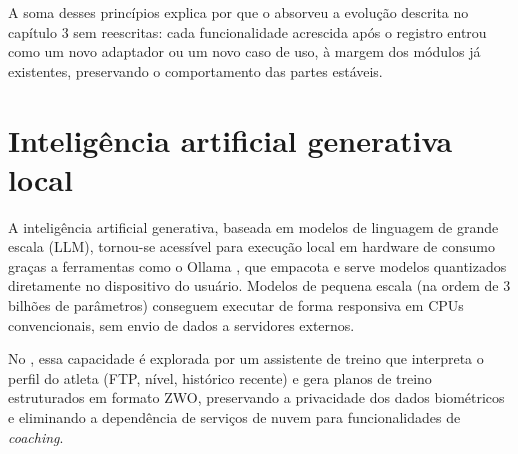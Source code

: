 A soma desses princípios explica por que o \argus{} absorveu a evolução
descrita no capítulo 3 sem reescritas: cada funcionalidade acrescida após o
registro entrou como um novo adaptador ou um novo caso de uso, à margem dos
módulos já existentes, preservando o comportamento das partes estáveis.

\section{Inteligência artificial generativa local}
\label{sec:ia-local}

A inteligência artificial generativa, baseada em modelos de linguagem de grande
escala (LLM), tornou-se acessível para execução local em hardware de consumo
graças a ferramentas como o Ollama \cite{ollama2024}, que empacota e serve
modelos quantizados diretamente no dispositivo do usuário. Modelos de pequena
escala (na ordem de 3 bilhões de parâmetros) conseguem executar de forma
responsiva em CPUs convencionais, sem envio de dados a servidores externos.

No \argus{}, essa capacidade é explorada por um assistente de treino que
interpreta o perfil do atleta (FTP, nível, histórico recente) e gera planos de
treino estruturados em formato ZWO, preservando a privacidade dos dados
biométricos e eliminando a dependência de serviços de nuvem para
funcionalidades de \textit{coaching}.
